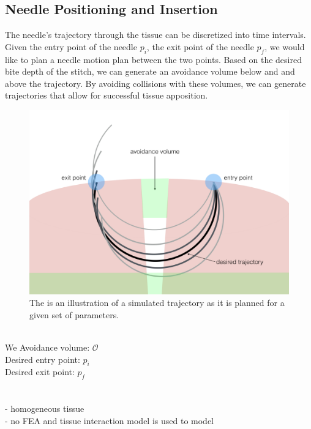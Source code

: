 \subsection{Needle Positioning and Insertion}
The needle's trajectory through the tissue can be discretized into time intervals. Given the entry point of the needle $p_i$, the exit point of the needle $p_f$, we would like to plan a needle motion plan between the two points. Based on the desired bite depth of the stitch, we can generate an avoidance volume below and and above the trajectory. By avoiding collisions with these volumes, we can generate trajectories that allow for successful tissue apposition.



\begin{figure}[t]
\centering
\includegraphics[width=0.85\linewidth]{figures/problem_image.jpg}
\caption{ The is an illustration of a simulated trajectory as it is planned for a given set of parameters.}
\label{fig:toyEx}
\vspace{-15pt}
\end{figure}


\\
We 
Avoidance volume: $\mathcal{O}$ \\
Desired entry point: $p_i$ \\
Desired exit point: $p_f$ \\

\\


\\
- homogeneous tissue\\
- no FEA and tissue interaction model is used to model 

